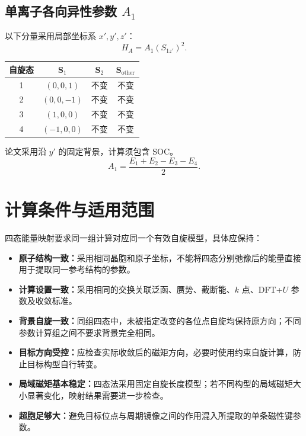 \documentclass[openany]{book}
\theoremstyle{mydefinition}
\theoremstyle{myplain}
\newcommand{\Sother}{\mathbf S_{\mathrm{other}}}
\begin{document}
\begin{minipage}{\textwidth}
\noindent\begin{minipage}{\textwidth}
\subsection{单离子各向异性参数 \(A_1\)}
以下分量采用局部坐标系 \(x',y',z'\)：
\[
H_A=A_1(S_{1z'})^2.
\]
\begin{center}
\begin{tabular}{cccc}
\toprule
自旋态 & \(\mathbf S_1\) & \(\mathbf S_2\) & \(\Sother\) \\ \midrule
1 & \((0,0,1)\)  & 不变 & 不变 \\
2 & \((0,0,-1)\) & 不变 & 不变 \\
3 & \((1,0,0)\)  & 不变 & 不变 \\
4 & \((-1,0,0)\) & 不变 & 不变 \\
\bottomrule
\end{tabular}
\end{center}
论文采用沿 \(y'\) 的固定背景，计算须包含 SOC。
\[
A_1=\frac{E_1+E_2-E_3-E_4}{2}.
\]
\end{minipage}


\end{minipage}
\endgroup
\clearpage
\section{计算条件与适用范围}

四态能量映射要求同一组计算对应同一个有效自旋模型，具体应保持：
\begin{itemize}
    \item \textbf{原子结构一致：}采用相同晶胞和原子坐标，不能将四态分别弛豫后的能量直接用于提取同一参考结构的参数。
    \item \textbf{计算设置一致：}采用相同的交换关联泛函、赝势、截断能、\(k\) 点、DFT+\(U\) 参数及收敛标准。
    \item \textbf{背景自旋一致：}同组四态中，未被指定改变的各位点自旋均保持原方向；不同参数计算组之间不要求背景完全相同。
    \item \textbf{目标方向受控：}应检查实际收敛后的磁矩方向，必要时使用约束自旋计算，防止目标构型自行转变。
    \item \textbf{局域磁矩基本稳定：}四态法采用固定自旋长度模型；若不同构型的局域磁矩大小显著变化，映射结果需要进一步检查。
    \item \textbf{超胞足够大：}避免目标位点与周期镜像之间的作用混入所提取的单条磁性键参数。
\end{itemize}
\end{document}
